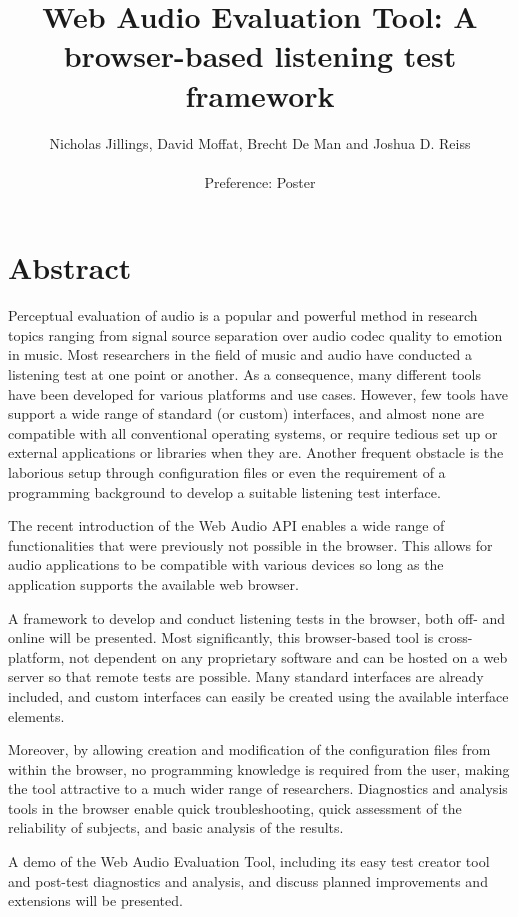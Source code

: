 \documentclass[a4paper]{article}
\title{Web Audio Evaluation Tool: A browser-based listening test framework}
\author{Nicholas Jillings, David Moffat, Brecht De Man and Joshua D. Reiss\\ \\
Preference: Poster }
\begin{document}
\maketitle
%

\section*{Abstract}
Perceptual evaluation of audio is a popular and powerful method in research topics ranging from signal source separation over audio codec quality to emotion in music. Most researchers in the field of music and audio have conducted a listening test at one point or another. As a consequence, many different tools have been developed for various platforms and use cases. However, few tools have support a wide range of standard (or custom) interfaces, and almost none are compatible with all conventional operating systems, or require tedious set up or external applications or libraries when they are. Another frequent obstacle is the laborious setup through configuration files or even the requirement of a programming background to develop a suitable listening test interface. 

The recent introduction of the Web Audio API enables a wide range of functionalities that were previously not possible in the browser. This allows for audio applications to be compatible with various devices so long as the application supports the available web browser. 

A framework to develop and conduct listening tests in the browser, both off- and online will be presented. Most significantly, this browser-based tool is cross-platform, not dependent on any proprietary software and can be hosted on a web server so that remote tests are possible. 
Many standard interfaces are already included, and custom interfaces can easily be created using the available interface elements. 

Moreover, by allowing creation and modification of the configuration files from within the browser, no programming knowledge is required from the user, making the tool attractive to a much wider range of researchers. Diagnostics and analysis tools in the browser enable quick troubleshooting, quick assessment of the reliability of subjects, and basic analysis of the results. 

A demo of the Web Audio Evaluation Tool, including its easy test creator tool and post-test diagnostics and analysis, and discuss planned improvements and extensions will be presented.
\end{document}
